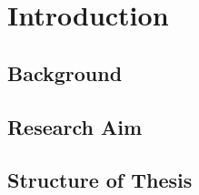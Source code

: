 \chapter{Introduction}
\section{Background}


\section{Research Aim}


\section{Structure of Thesis}
